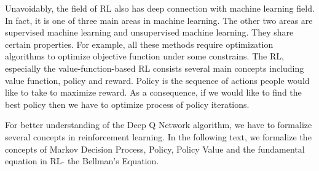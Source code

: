 \documentclass{article}
\begin{document}
Unavoidably, the field of RL also has deep connection with machine learning field. In fact, it is one of three main areas in machine learning. The other two areas are supervised machine learning and unsupervised machine learning. They share certain properties. For example, all these methods require optimization algorithms to optimize objective function under some constrains. The RL, especially the value-function-based RL consists several main concepts including value function, policy and reward. Policy is the sequence of actions people would like to take to maximize reward. As a consequence, if we would like to find the best policy then we have to optimize process of policy iterations.
 
For better understanding of the Deep Q Network algorithm, we have to formalize several concepts in reinforcement learning. In the following text, we formalize the concepts of Markov Decision Process, Policy, Policy Value and the fundamental equation in RL- the Bellman's Equation.
\end{document}
